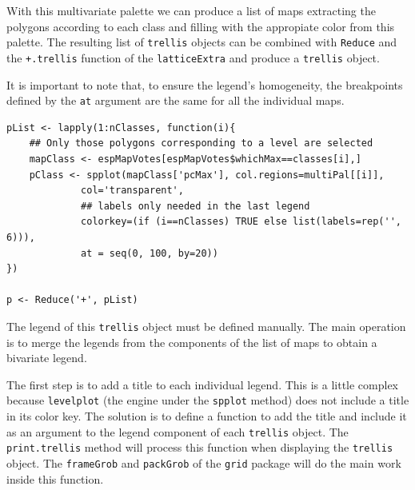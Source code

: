 \documentclass[smallroyalvopaper]{memoir}
\begin{document}
With this multivariate palette we can produce a list of maps
extracting the polygons according to each class and filling with
the appropiate color from this palette. The resulting list of
\texttt{trellis} objects can be combined with \texttt{Reduce} and the
\texttt{+.trellis} function of the \texttt{latticeExtra} and produce a \texttt{trellis}
object.

It is important to note that, to ensure the legend's homogeneity, the
breakpoints defined by the \texttt{at} argument are the same for all the
individual maps.

 
\lstset{language=R,numbers=none}
\begin{lstlisting}
pList <- lapply(1:nClasses, function(i){
    ## Only those polygons corresponding to a level are selected
    mapClass <- espMapVotes[espMapVotes$whichMax==classes[i],]
    pClass <- spplot(mapClass['pcMax'], col.regions=multiPal[[i]],
		     col='transparent',
		     ## labels only needed in the last legend
		     colorkey=(if (i==nClasses) TRUE else list(labels=rep('', 6))),
		     at = seq(0, 100, by=20))
})

p <- Reduce('+', pList)
\end{lstlisting}

The legend of this \texttt{trellis} object must be defined
manually. The main operation is to merge the legends from the
components of the list of maps to obtain a bivariate
legend. 

The first step is to add a title to each individual legend.  This is a
little complex because \texttt{levelplot} (the engine under the \texttt{spplot}
method) does not include a title in its color key. The solution is to
define a function to add the title and include it as an argument to
the legend component of each \texttt{trellis} object. The \texttt{print.trellis}
method will process this function when displaying the \texttt{trellis}
object. The \texttt{frameGrob} and \texttt{packGrob} of the \texttt{grid} package will do
the main work inside this function.
\end{document}
